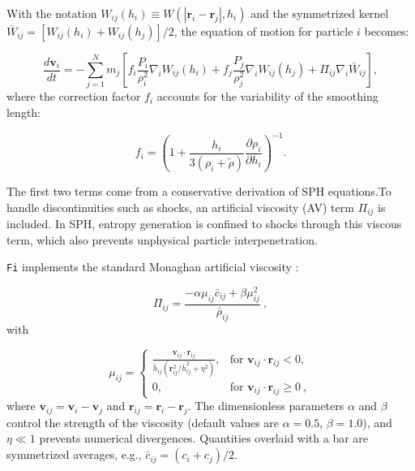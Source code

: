 With the notation $W_{ij}(h_i) \equiv W(|\mathbf{r}_i - \mathbf{r}_j|, h_i)$ and the symmetrized kernel $\bar{W}_{ij} = [W_{ij}(h_i) + W_{ij}(h_j)]/2$, the equation of motion for particle $i$ becomes:

\begin{equation}
	\frac{d\mathbf{v}_i}{dt} = -\sum_{j=1}^N m_j \left[
	f_i \frac{P_i}{\rho_i^2} \nabla_i W_{ij}(h_i) +
	f_j \frac{P_j}{\rho_j^2} \nabla_i W_{ij}(h_j) +
	\Pi_{ij} \nabla_i \bar{W}_{ij}
	\right],
	\label{eq:3.42}
\end{equation}
where the correction factor $f_i$ accounts for the variability of the smoothing length:

\begin{equation}
	f_i = \left( 1 + \frac{h_i}{3(\rho_i + \tilde{\rho})} \frac{\partial \rho_i}{\partial h_i} \right)^{-1}.
	\label{eq:sph_fi_factor}
\end{equation}


The first two terms come from a conservative derivation of SPH equations.To handle discontinuities such as shocks, an artificial viscosity (AV) term $\Pi_{ij}$ is included. In SPH, entropy generation is confined to shocks through this viscous term, which also prevents unphysical particle interpenetration. 

\texttt{Fi} implements the standard Monaghan artificial viscosity \citep{monaghan1992smoothed, pelupessy2005numerical}:

\begin{equation}
	\Pi_{ij} = \frac{-\alpha \mu_{ij} \bar{c}_{ij} + \beta \mu_{ij}^2}{\bar{\rho}_{ij}}~,
	\label{eq:3.AV}
\end{equation}
with

\begin{equation}
	\mu_{ij} = 
	\begin{cases}
		\frac{\mathbf{v}_{ij} \cdot \mathbf{r}_{ij}}{\bar{h}_{ij}(\mathbf{r}_{ij}^2/\bar{h}_{ij}^2 + \eta^2)}, & \text{for~} \mathbf{v}_{ij} \cdot \mathbf{r}_{ij} < 0, \\
		0, & \text{for~} \mathbf{v}_{ij} \cdot \mathbf{r}_{ij} \geq 0~,
	\end{cases}
	\label{eq:3.45}
\end{equation}
where $\mathbf{v}_{ij} = \mathbf{v}_i - \mathbf{v}_j$ and $\mathbf{r}_{ij} = \mathbf{r}_i - \mathbf{r}_j$. The dimensionless parameters $\alpha$ and $\beta$ control the strength of the viscosity (default values are $\alpha = 0.5$, $\beta = 1.0$), and $\eta \ll 1$ prevents numerical divergences. Quantities overlaid with a bar are symmetrized averages, e.g., $\bar{c}_{ij} = (c_i + c_j)/2$. 

